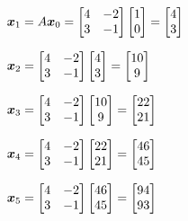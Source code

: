 \begin{solution}[6.8cm]
\(\boldsymbol{x}_1=A\boldsymbol{x}_0 = \begin{bmatrix}4&-2\\3&-1\end{bmatrix}
\begin{bmatrix}1\\0\end{bmatrix}=\begin{bmatrix}4\\3\end{bmatrix}\)

\smallskip \noindent
\(\boldsymbol{x}_2=\begin{bmatrix}4&-2\\3&-1\end{bmatrix}\begin{bmatrix}4\\3\end{bmatrix}
=\begin{bmatrix}10\\9\end{bmatrix}\)

\smallskip \noindent
\(\boldsymbol{x}_3=\begin{bmatrix}4&-2\\3&-1\end{bmatrix}\begin{bmatrix}10\\9\end{bmatrix}
=\begin{bmatrix}22\\21\end{bmatrix}\)

\smallskip \noindent
\(\boldsymbol{x}_4=\begin{bmatrix}4&-2\\3&-1\end{bmatrix}\begin{bmatrix}22\\21\end{bmatrix}
=\begin{bmatrix}46\\45\end{bmatrix}\)

\smallskip \noindent
\(\boldsymbol{x}_5=\begin{bmatrix}4&-2\\3&-1\end{bmatrix}\begin{bmatrix}46\\45\end{bmatrix}
=\begin{bmatrix}94\\93\end{bmatrix}\)


\end{solution}
